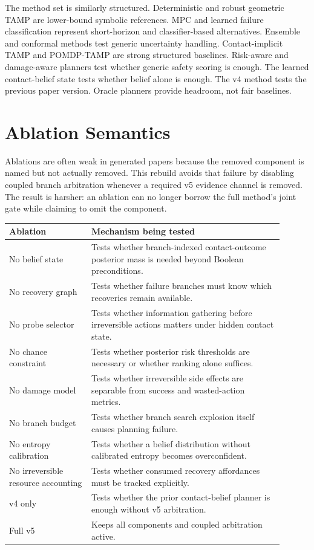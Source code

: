 \documentclass{article}
\begin{document}
The method set is similarly structured. Deterministic and robust geometric TAMP are lower-bound symbolic references. MPC and learned failure classification represent short-horizon and classifier-based alternatives. Ensemble and conformal methods test generic uncertainty handling. Contact-implicit TAMP and POMDP-TAMP are strong structured baselines. Risk-aware and damage-aware planners test whether generic safety scoring is enough. The learned contact-belief state tests whether belief alone is enough. The v4 method tests the previous paper version. Oracle planners provide headroom, not fair baselines.

\clearpage
\section{Ablation Semantics}
Ablations are often weak in generated papers because the removed component is named but not actually removed. This rebuild avoids that failure by disabling coupled branch arbitration whenever a required v5 evidence channel is removed. The result is harsher: an ablation can no longer borrow the full method's joint gate while claiming to omit the component.

\begin{longtable}{p{0.27\linewidth}p{0.63\linewidth}}
\toprule
Ablation & Mechanism being tested \\
\midrule
No belief state & Tests whether branch-indexed contact-outcome posterior mass is needed beyond Boolean preconditions. \\
No recovery graph & Tests whether failure branches must know which recoveries remain available. \\
No probe selector & Tests whether information gathering before irreversible actions matters under hidden contact state. \\
No chance constraint & Tests whether posterior risk thresholds are necessary or whether ranking alone suffices. \\
No damage model & Tests whether irreversible side effects are separable from success and wasted-action metrics. \\
No branch budget & Tests whether branch search explosion itself causes planning failure. \\
No entropy calibration & Tests whether a belief distribution without calibrated entropy becomes overconfident. \\
No irreversible resource accounting & Tests whether consumed recovery affordances must be tracked explicitly. \\
v4 only & Tests whether the prior contact-belief planner is enough without v5 arbitration. \\
Full v5 & Keeps all components and coupled arbitration active. \\
\bottomrule
\end{longtable}
\end{document}
